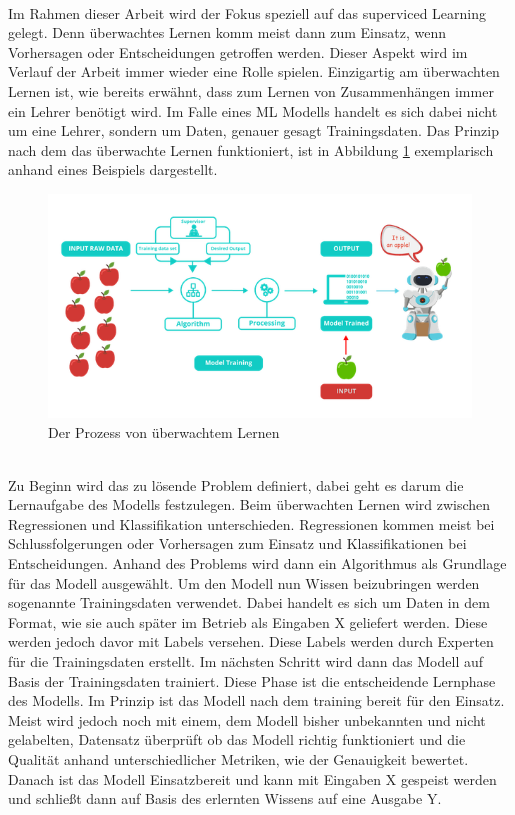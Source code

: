 \begin{onehalfspace}
        \\
        Im Rahmen dieser Arbeit wird der Fokus speziell auf das superviced Learning gelegt. Denn überwachtes Lernen komm meist dann zum Einsatz, wenn Vorhersagen oder Entscheidungen getroffen werden. Dieser Aspekt wird im Verlauf der Arbeit immer wieder eine Rolle spielen. Einzigartig am überwachten Lernen ist, wie bereits erwähnt, dass zum Lernen von Zusammenhängen immer ein \glqq{}Lehrer\grqq{} benötigt wird. Im Falle eines \ac{ML} Modells handelt es sich dabei nicht um eine Lehrer, sondern um Daten, genauer gesagt Trainingsdaten.
        Das Prinzip nach dem das überwachte Lernen funktioniert, ist in Abbildung \ref*{fig:learningProcess} exemplarisch anhand eines Beispiels dargestellt.
        \begin{figure}[h]
            \centering
            \includegraphics[width = 14cm]{Bilder/superviced_learning.png}
            \caption{Der Prozess von überwachtem Lernen \cite{Kharwal2020}}
            \label{fig:learningProcess}
        \end{figure}
        \\
        Zu Beginn wird das zu lösende Problem definiert, dabei geht es darum die Lernaufgabe des Modells festzulegen. Beim überwachten Lernen wird zwischen Regressionen und Klassifikation unterschieden. Regressionen kommen meist bei Schlussfolgerungen oder Vorhersagen zum Einsatz und Klassifikationen bei Entscheidungen. 
        Anhand des Problems wird dann ein Algorithmus als Grundlage für das Modell ausgewählt. Um den Modell nun Wissen beizubringen werden sogenannte Trainingsdaten verwendet. Dabei handelt es sich um Daten in dem Format, wie sie auch später im Betrieb als Eingaben X geliefert werden. Diese werden jedoch davor mit Labels versehen. Diese Labels werden durch Experten für die Trainingsdaten erstellt. Im nächsten Schritt wird dann das Modell auf Basis der Trainingsdaten trainiert. Diese Phase ist die entscheidende Lernphase des Modells. Im Prinzip ist das Modell nach dem training bereit für den Einsatz. Meist wird jedoch noch mit einem, dem Modell bisher unbekannten und nicht gelabelten, Datensatz überprüft ob das Modell richtig funktioniert und die Qualität anhand unterschiedlicher Metriken, wie der Genauigkeit bewertet. Danach ist das Modell Einsatzbereit und kann mit Eingaben X gespeist werden und schließt dann auf Basis des erlernten Wissens auf eine Ausgabe Y.\cite{Horn2022}\cite{Döbel2018}

\end{onehalfspace}
